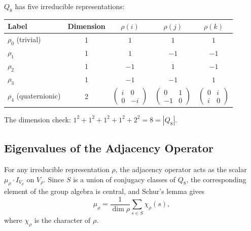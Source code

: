 \documentclass[11pt,a4paper]{article}
\begin{document}
  $Q_8$ has five irreducible representations:
  \begin{center}
    \begin{tabular}{lcccc}
      \hline
      Label              & Dimension & $\rho(i)$ & $\rho(j)$ & $\rho(k)$ \\
      \hline
      $\rho_0$ (trivial) & 1         & $1$       & $1$       & $1$       \\
      $\rho_1$           & 1         & $1$       & $-1$      & $-1$      \\
      $\rho_2$           & 1         & $-1$      & $1$       & $-1$      \\
      $\rho_3$           & 1         & $-1$      & $-1$      & $1$       \\
      $\rho_4$ (quaternionic) & 2 &
      $\begin{pmatrix}
         i&0\\0&-i
      \end{pmatrix}$ &
      $\begin{pmatrix}
         0&1\\-1&0
      \end{pmatrix}$ &
      $\begin{pmatrix}
         0&i\\i&0
      \end{pmatrix}$ \\
      \hline
    \end{tabular}
  \end{center}
  The dimension check:
  $1^2 + 1^2 + 1^2 + 1^2 + 2^2 = 8 = |Q_8|$.
\subsection{Eigenvalues of the Adjacency Operator}
  \label{subsec:eigenvalues-of-adjacency-operator}

  For any irreducible representation $\rho$, the adjacency operator acts as the
  scalar $\mu_\rho \cdot I_{V_\rho}$ on $V_\rho$.
  Since $S$ is a union of conjugacy classes of $Q_8$, the corresponding element
  of the group algebra is central, and Schur's lemma gives
  \begin{equation}
    \mu_\rho = \frac{1}{\dim \rho} \sum_{s \in S} \chi_\rho(s),
  \end{equation}
  where $\chi_\rho$ is the character of $\rho$.
\end{document}
